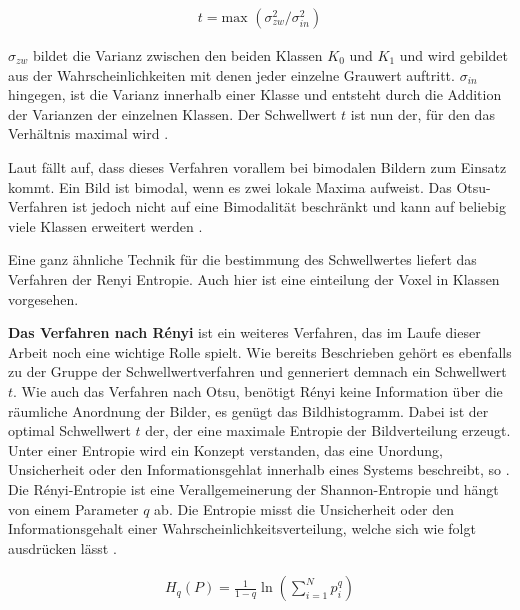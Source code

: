\begin{align}
	t = \text{max }(\sigma_{zw}^{2}/ \sigma_{in}^{2})
\end{align}

$\sigma_{zw}$ bildet die Varianz zwischen den beiden Klassen $K_{0}$ und $K_{1}$
und wird gebildet aus der Wahrscheinlichkeiten mit denen jeder einzelne Grauwert
auftritt. $\sigma_{in}$ hingegen, ist die Varianz innerhalb einer Klasse und
entsteht durch die Addition der Varianzen der einzelnen Klassen. Der Schwellwert
$t$ ist nun der, für den das Verhältnis maximal wird \citep[vgl.][Seite264]{lehmann2013bildverarbeitung}.

Laut \citet[Seite264]{lehmann2013bildverarbeitung} fällt auf, dass dieses Verfahren
vorallem bei bimodalen Bildern zum Einsatz kommt. Ein Bild ist bimodal, wenn es zwei
lokale Maxima aufweist. Das Otsu-Verfahren ist jedoch nicht auf eine Bimodalität
beschränkt und kann auf beliebig viele Klassen erweitert werden \citep[vgl.][Seite264]{lehmann2013bildverarbeitung}.

Eine ganz ähnliche Technik für die bestimmung des Schwellwertes liefert das
Verfahren der Renyi Entropie. Auch hier ist eine einteilung der Voxel in Klassen
vorgesehen.
\pagebreak

\textbf{Das Verfahren nach Rényi} ist ein weiteres Verfahren, das im Laufe dieser
Arbeit noch eine wichtige Rolle spielt. Wie bereits Beschrieben gehört es
ebenfalls zu der Gruppe der Schwellwertverfahren und genneriert demnach ein
Schwellwert $t$. Wie auch das Verfahren nach Otsu, benötigt Rényi keine
Information über die räumliche Anordnung der Bilder, es genügt das Bildhistogramm.
Dabei ist der optimal Schwellwert $t$ der, der eine maximale Entropie der Bildverteilung
erzeugt. Unter einer Entropie wird ein Konzept verstanden, das eine Unordung,
Unsicherheit oder den Informationsgehlat innerhalb eines Systems beschreibt, so \citet{bein2006}.
Die Rényi-Entropie ist eine Verallgemeinerung der Shannon-Entropie und hängt von
einem Parameter $q$ ab. Die Entropie misst die Unsicherheit oder den
Informationsgehalt einer Wahrscheinlichkeitsverteilung, welche sich wie folgt ausdrücken
lässt \citep[vgl.][K. 2]{bromiley2004}.

\begin{align}
	H_{q}(P) = \frac{1}{1-q}\ln \left( \sum_{i=1}^{N}p_{i}^{q}\right)
\end{align}

